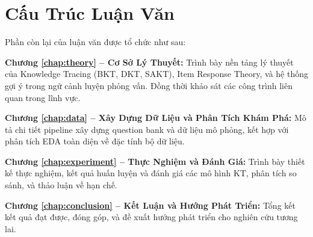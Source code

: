 \section{Cấu Trúc Luận Văn}
\label{sec:structure}

Phần còn lại của luận văn được tổ chức như sau:

\textbf{Chương \ref{chap:theory} -- Cơ Sở Lý Thuyết:} Trình bày nền tảng lý thuyết của Knowledge Tracing (BKT, DKT, SAKT), Item Response Theory, và hệ thống gợi ý trong ngữ cảnh luyện phỏng vấn. Đồng thời khảo sát các công trình liên quan trong lĩnh vực.

\textbf{Chương \ref{chap:data} -- Xây Dựng Dữ Liệu và Phân Tích Khám Phá:} Mô tả chi tiết pipeline xây dựng question bank và dữ liệu mô phỏng, kết hợp với phân tích EDA toàn diện về đặc tính bộ dữ liệu.

\textbf{Chương \ref{chap:experiment} -- Thực Nghiệm và Đánh Giá:} Trình bày thiết kế thực nghiệm, kết quả huấn luyện và đánh giá các mô hình KT, phân tích so sánh, và thảo luận về hạn chế.

\textbf{Chương \ref{chap:conclusion} -- Kết Luận và Hướng Phát Triển:} Tổng kết kết quả đạt được, đóng góp, và đề xuất hướng phát triển cho nghiên cứu tương lai.
